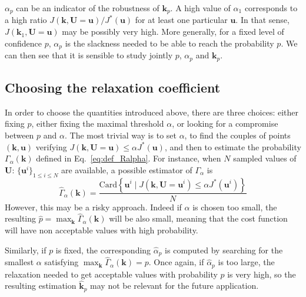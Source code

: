 \documentclass[preprint, review, 1p]{elsarticle}
\newcommand{\checkap}{{\alpha}_p}
\newcommand{\checka}{{\alpha}}
\newcommand{\checkk}{\mathbf{k}}
\newcommand{\checkkp}{{\mathbf{k}}_p}
\begin{document}
$\checkap$ can be an indicator of the robustness of $\checkkp$.  
A high value of $\checka_1$ corresponds to a high ratio ${J(\mathbf{k},\mathbf{U}=\mathbf{u})/J^*(\mathbf{u})}$ for at least one particular $\mathbf{u}$. In that sense, $J(\checkk_1,\mathbf{U}=\mathbf{u})$ may be possibly very high.
More generally, for a fixed level of confidence $p$, $\checkap$ is the slackness needed to be able to reach the probability $p$. %
We can then see that it is sensible to study jointly $p$, $\checkap$ and $\checkkp$.


\subsection{Choosing the relaxation coefficient}%
\label{ssec:balance}

In order to choose the quantities introduced above, there are three choices: either fixing $p$, either fixing the maximal threshold $\alpha$, or looking for a compromise between $p$ and $\alpha$.
The most trivial way is to set $\alpha$, to find the couples of points $(\mathbf{k},\mathbf{u})$ verifying $J(\mathbf{k},\mathbf{U}=\mathbf{u}) \leq \alpha J^*(\mathbf{u})$, and then to estimate the probability $\Gamma_{\alpha}(\mathbf{k})$ defined in Eq.~\eqref{eq:def_Ralpha}.
For instance, when $N$ sampled values of $\mathbf{U}$: $\{\mathbf{u}^i\}_{1\leq i \leq N}$ are available, a possible estimator of $\Gamma_{\alpha}$ is
\begin{equation}
\hat{\Gamma}_{\alpha}(\mathbf{k}) = \frac{\mathrm{Card} \left\{\mathbf{u}^i \mid J(\mathbf{k},\mathbf{U}=\mathbf{u}^i) \leq \alpha J^*(\mathbf{u}^i)\right\}}{N}
\end{equation}
However, this may be a risky approach. Indeed if $\alpha$ is chosen too small, the resulting $\hat{p}=\max_{\mathbf{k}} \hat{\Gamma}_{\alpha}(\mathbf{k})$ will be also small, meaning that the cost function will have non acceptable values with high probability.

Similarly, if $p$ is fixed, the corresponding $\hat{\checka}_p$ is computed by searching for the smallest $\alpha$ satisfying $\max_{\mathbf{k}} \hat{\Gamma}_{\alpha}(\mathbf{k})=p$. Once again, if $\hat{\checka}_p$ is too large, the relaxation needed to get acceptable values with probability $p$ is very high, so the resulting estimation $\hat{\checkk}_p$ may not be relevant for the future application.
\end{document}
